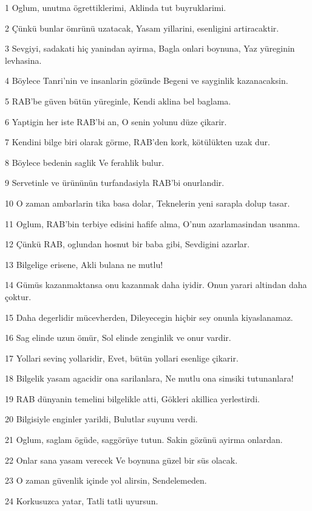 \par 1 Oglum, unutma ögrettiklerimi, Aklinda tut buyruklarimi.
\par 2 Çünkü bunlar ömrünü uzatacak, Yasam yillarini, esenligini artiracaktir.
\par 3 Sevgiyi, sadakati hiç yanindan ayirma, Bagla onlari boynuna, Yaz yüreginin levhasina.
\par 4 Böylece Tanri'nin ve insanlarin gözünde Begeni ve sayginlik kazanacaksin.
\par 5 RAB'be güven bütün yüreginle, Kendi aklina bel baglama.
\par 6 Yaptigin her iste RAB'bi an, O senin yolunu düze çikarir.
\par 7 Kendini bilge biri olarak görme, RAB'den kork, kötülükten uzak dur.
\par 8 Böylece bedenin saglik Ve ferahlik bulur.
\par 9 Servetinle ve ürününün turfandasiyla RAB'bi onurlandir.
\par 10 O zaman ambarlarin tika basa dolar, Teknelerin yeni sarapla dolup tasar.
\par 11 Oglum, RAB'bin terbiye edisini hafife alma, O'nun azarlamasindan usanma.
\par 12 Çünkü RAB, oglundan hosnut bir baba gibi, Sevdigini azarlar.
\par 13 Bilgelige erisene, Akli bulana ne mutlu!
\par 14 Gümüs kazanmaktansa onu kazanmak daha iyidir. Onun yarari altindan daha çoktur.
\par 15 Daha degerlidir mücevherden, Dileyecegin hiçbir sey onunla kiyaslanamaz.
\par 16 Sag elinde uzun ömür, Sol elinde zenginlik ve onur vardir.
\par 17 Yollari sevinç yollaridir, Evet, bütün yollari esenlige çikarir.
\par 18 Bilgelik yasam agacidir ona sarilanlara, Ne mutlu ona simsiki tutunanlara!
\par 19 RAB dünyanin temelini bilgelikle atti, Gökleri akillica yerlestirdi.
\par 20 Bilgisiyle enginler yarildi, Bulutlar suyunu verdi.
\par 21 Oglum, saglam ögüde, saggörüye tutun. Sakin gözünü ayirma onlardan.
\par 22 Onlar sana yasam verecek Ve boynuna güzel bir süs olacak.
\par 23 O zaman güvenlik içinde yol alirsin, Sendelemeden.
\par 24 Korkusuzca yatar, Tatli tatli uyursun.
